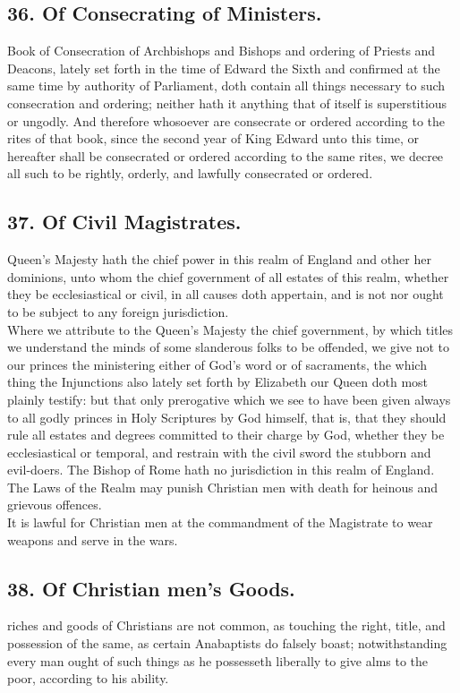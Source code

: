 \newpage

\subsection{36. Of Consecrating of Ministers.}
 Book of Consecration of Archbishops and Bishops and ordering of Priests and Deacons, lately set forth in the time of Edward the Sixth and confirmed at the same time by authority of Parliament, doth contain all things necessary to such consecration and ordering; neither hath it anything that of itself is superstitious or ungodly. And therefore whosoever are consecrate or ordered according to the rites of that book, since the second year of King Edward unto this time, or hereafter shall be consecrated or ordered according to the same rites, we decree all such to be rightly, orderly, and lawfully consecrated or ordered.

\subsection{37. Of Civil Magistrates.}
 Queen's Majesty hath the chief power in this realm of England and other her dominions, unto whom the chief government of all estates of this realm, whether they be ecclesiastical or civil, in all causes doth appertain, and is not nor ought to be subject to any foreign jurisdiction.\\
Where we attribute to the Queen's Majesty the chief government, by which titles we understand the minds of some slanderous folks to be offended, we give not to our princes the ministering either of God's word or of sacraments, the which thing the Injunctions also lately set forth by Elizabeth our Queen doth most plainly testify: but that only prerogative which we see to have been given always to all godly princes in Holy Scriptures by God himself, that is, that they should rule all estates and degrees committed to their charge by God, whether they be ecclesiastical or temporal, and restrain with the civil sword the stubborn and evil-doers. The Bishop of Rome hath no jurisdiction in this realm of England.\\
The Laws of the Realm may punish Christian men with death for heinous and grievous offences.\\
It is lawful for Christian men at the commandment of the Magistrate to wear weapons and serve in the wars.

\newpage

\subsection{38. Of Christian men's Goods.}
 riches and goods of Christians are not common, as touching the right, title, and possession of the same, as certain Anabaptists do falsely boast; notwithstanding every man ought of such things as he possesseth liberally to give alms to the poor, according to his ability.

